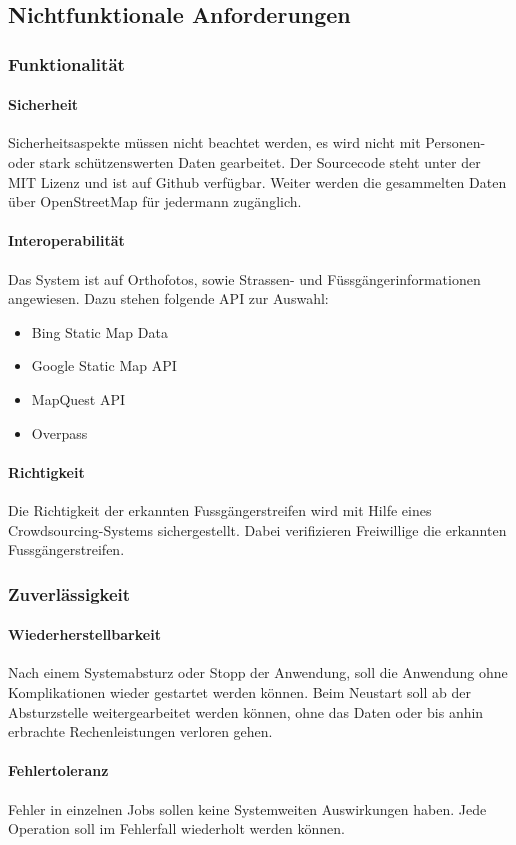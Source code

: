 \subsection{Nichtfunktionale Anforderungen}
\subsubsection{Funktionalität}
\paragraph{Sicherheit}
Sicherheitsaspekte müssen nicht beachtet werden, es wird nicht mit Personen- oder stark schützenswerten Daten gearbeitet. Der Sourcecode steht unter der MIT Lizenz und ist auf Github verfügbar. Weiter werden die gesammelten Daten über OpenStreetMap für jedermann zugänglich.
\paragraph{Interoperabilität}
Das System ist auf Orthofotos, sowie Strassen- und Füssgängerinformationen angewiesen.
Dazu stehen folgende API zur Auswahl:
\begin{itemize}
	\item Bing Static Map Data
	\item Google Static Map API
	\item MapQuest API
	\item Overpass
\end{itemize}

\paragraph{Richtigkeit}
Die Richtigkeit der erkannten Fussgängerstreifen wird mit Hilfe eines Crowdsourcing-Systems sichergestellt. Dabei verifizieren Freiwillige die erkannten Fussgängerstreifen.
\subsubsection{Zuverlässigkeit}
\paragraph{Wiederherstellbarkeit}
Nach einem Systemabsturz oder Stopp der Anwendung, soll die Anwendung ohne Komplikationen wieder gestartet werden können. Beim Neustart soll ab der Absturzstelle weitergearbeitet werden können, ohne das Daten oder bis anhin erbrachte Rechenleistungen verloren gehen.
\paragraph{Fehlertoleranz}
Fehler in einzelnen Jobs sollen keine Systemweiten Auswirkungen haben. Jede Operation soll im Fehlerfall wiederholt werden können.
